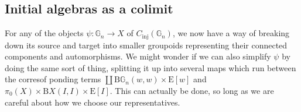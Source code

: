 \documentclass{amsart} %
\begin{document}
\subsection{Initial algebras as a colimit}

For any of the objects $\psi : \mathbb{G}_n \to X$ of $C_{\mathrm{inj}}(\mathbb{G}_n)$, we now have a way of breaking down its source and target into smaller groupoids representing their connected components and automorphisms. We might wonder if we can also simplify $\psi$ by doing the same sort of thing, splitting it up into several maps which run between the corresof ponding terms $\coprod \mathrm{B}\mathbb{G}_n(w, w) \times \mathrm{E}[w]$ and $\pi_0(X) \times \mathrm{B}X(I,I) \times \mathrm{E}[I]$. This can actually be done, so long as we are careful about how we choose our representatives.
\end{document}
